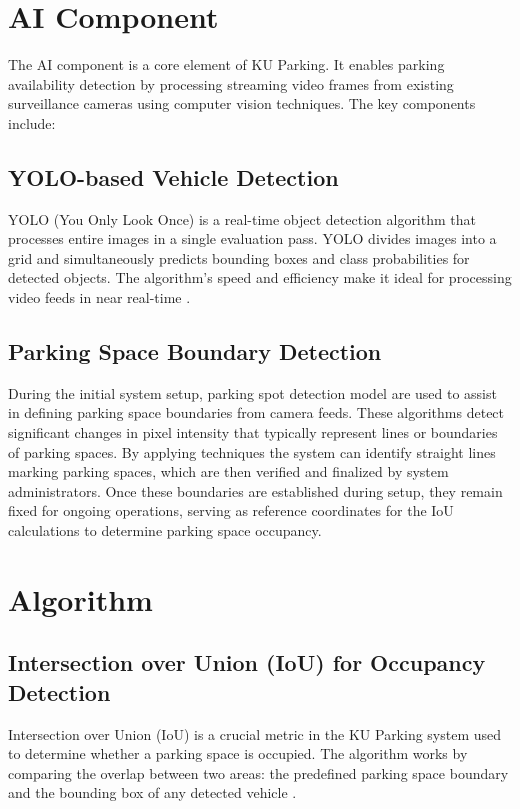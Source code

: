 \section{AI Component}
\label{section:ai-component}

The AI component is a core element of KU Parking. 
It enables parking availability detection by processing streaming video frames from existing surveillance cameras using computer vision techniques. 
The key components include:

\subsection{YOLO-based Vehicle Detection}
YOLO (You Only Look Once) is a real-time object detection algorithm that processes entire images in a single evaluation pass.
YOLO divides images into a grid and simultaneously predicts bounding boxes and class probabilities for detected objects. 
The algorithm's speed and efficiency make it ideal for processing video feeds in near real-time \cite{YOLO}.

\subsection{Parking Space Boundary Detection}
During the initial system setup, parking spot detection model are used to assist in defining parking space boundaries from camera feeds. 
These algorithms detect significant changes in pixel intensity that typically represent lines or boundaries of parking spaces. 
By applying techniques the system can identify straight lines marking parking spaces, 
which are then verified and finalized by system administrators. Once these boundaries are established during setup, 
they remain fixed for ongoing operations, serving as reference coordinates for the IoU calculations to determine parking space occupancy.

\section{Algorithm}
\label{section:algorithm}
\subsection{Intersection over Union (IoU) for Occupancy Detection}
Intersection over Union (IoU) is a crucial metric in the KU Parking system used to determine whether a parking space is occupied. 
The algorithm works by comparing the overlap between two areas: the predefined parking space boundary and the bounding box of any detected vehicle \cite{barseghyan2023parking}.

